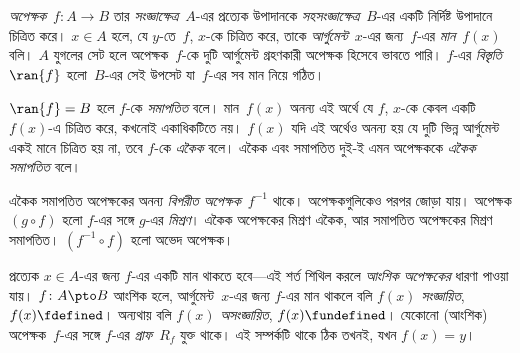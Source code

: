 \emph{অপেক্ষক}~$f\colon A \to B$ তার \emph{সংজ্ঞাক্ষেত্র}~$A$-এর
প্রত্যেক উপাদানকে \emph{সহসংজ্ঞাক্ষেত্র}~$B$-এর একটি নির্দিষ্ট
উপাদানে চিত্রিত করে। $x \in A$ হলে, যে $y$-তে~$f$, $x$-কে
চিত্রিত করে, তাকে \emph{আর্গুমেন্ট}~$x$-এর জন্য~$f$-এর
\emph{মান}~$f(x)$ বলি। $A$ যুগলের সেট হলে অপেক্ষক~$f$-কে
দুটি আর্গুমেন্ট গ্রহণকারী অপেক্ষক হিসেবে ভাবতে পারি। $f$-এর
\emph{বিস্তৃতি}~$\ran{f}$ হলো~$B$-এর সেই উপসেট যা~$f$-এর সব
মান নিয়ে গঠিত।

$\ran{f} = B$ হলে $f$-কে \emph{সমাপতিত} বলে। মান~$f(x)$ অনন্য
এই অর্থে যে $f$, $x$-কে কেবল একটি $f(x)$-এ চিত্রিত করে, কখনোই
একাধিকটিতে নয়। $f(x)$ যদি এই অর্থেও অনন্য হয় যে দুটি ভিন্ন
আর্গুমেন্ট একই মানে চিত্রিত হয় না, তবে $f$-কে \emph{একৈক} বলে।
একৈক এবং সমাপতিত দুই-ই এমন অপেক্ষককে \emph{একৈক সমাপতিত} বলে।

একৈক সমাপতিত অপেক্ষকের অনন্য \emph{বিপরীত অপেক্ষক}~$f^{-1}$ থাকে।
অপেক্ষকগুলিকেও পরপর জোড়া যায়। অপেক্ষক $(g \circ f)$ হলো $f$-এর
সঙ্গে $g$-এর \emph{মিশ্রণ}। একৈক অপেক্ষকের মিশ্রণ একৈক, আর
সমাপতিত অপেক্ষকের মিশ্রণ সমাপতিত। $(f^{-1} \circ f)$ হলো অভেদ
অপেক্ষক।

প্রত্যেক $x \in A$-এর জন্য $f$-এর একটি মান থাকতে হবে—এই শর্ত
শিথিল করলে \emph{আংশিক অপেক্ষকের} ধারণা পাওয়া যায়। $f\colon
A \pto B$ আংশিক হলে, আর্গুমেন্ট~$x$-এর জন্য $f$-এর মান থাকলে
বলি $f(x)$ \emph{সংজ্ঞায়িত}, $f(x) \fdefined$। অন্যথায় বলি
$f(x)$ \emph{অসংজ্ঞায়িত}, $f(x) \fundefined$। যেকোনো (আংশিক)
অপেক্ষক~$f$-এর সঙ্গে $f$-এর \emph{গ্রাফ}~$R_f$ যুক্ত থাকে। এই
সম্পর্কটি থাকে ঠিক তখনই, যখন $f(x) = y$।
